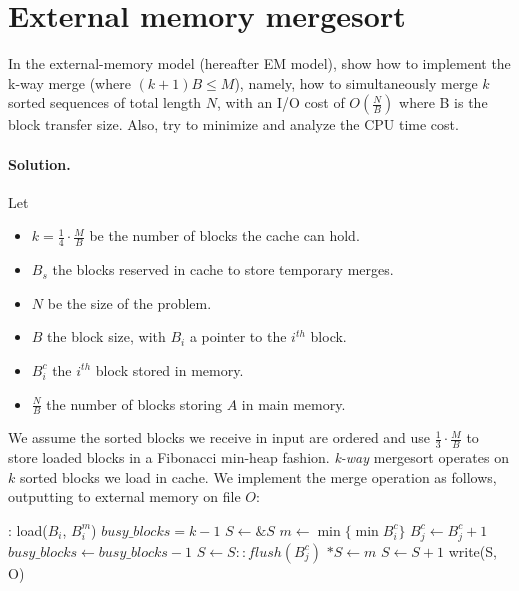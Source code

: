 \section{External memory mergesort}
In the external-memory model (hereafter EM model), show how to implement the k-way merge (where $(k + 1)B \leq M$), namely, how to simultaneously merge $k$ sorted sequences of total length $N$, with an I/O cost of $O(\frac{N}{B})$
where B is the block transfer size.
Also, try to minimize and analyze the CPU time cost.

\vspace{0.5cm}
\paragraph{Solution.}
Let
    \begin{itemize}
    \item $k = \frac{1}{4}\cdot \frac{M}{B}$ be the number of blocks the cache can hold.
    \item $B_s$ the blocks reserved in cache to store temporary merges.
    \item $N$ be the size of the problem.
    \item $B$ the block size, with $B_i$ a pointer to the $i^{th}$ block.
    \item $B_{i}^{c}$ the $i^{th}$ block stored in memory.
    \item $\frac{N}{B}$ the number of blocks storing $A$ in main memory.
    \end{itemize}
We assume the sorted blocks we receive in input are ordered and use $\frac{1}{3} \cdot \frac{M}{B}$ to store loaded blocks in a Fibonacci min-heap fashion.
\emph{k-way} mergesort operates on $k$ sorted blocks we load in cache.
We implement the merge operation as follows, outputting to external memory on file $O$:
    \begin{algorithmic}[1]
    :
        \State load($B_i$, $B_i^m$)\;           
    \EndFor
    \State $busy\_blocks = k - 1$\;             
    \State $S \gets \&S$\;                      
        \State $m \gets \min\{\min{B_i^c}\}$\;  
        \State $B_j^c \gets B_j^c + 1$\;        
            \State $busy\_blocks \gets busy\_blocks - 1$\;
        \EndIf
            \State $S \gets S :: flush(B_j^c)$\;    
        \EndIf
        \State $*S \gets m$\;
        \State $S \gets S + 1$\;                
    \EndWhile
    \State write(S, O)\;                        
    \EndFunction
\end{algorithmic}

